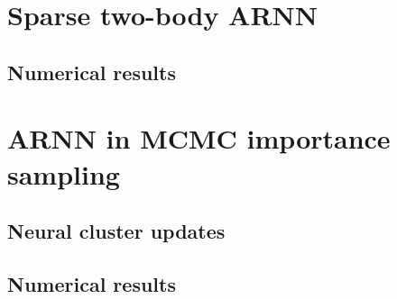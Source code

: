 \section{Sparse two-body ARNN}

\cite{pan2021solving}

\cite{biazzo2023autoregressive}

\cite{biazzo2024sparse}

\subsection{Numerical results}

\section{ARNN in MCMC importance sampling}
\label{sec:arnn-mcmc}

\cite{nicoli2020asymptotically}

\cite{ciarella2023machine}

\subsection{Neural cluster updates}
\label{sec:ncus}

\cite{wu2021unbiased}

\subsection{Numerical results}
